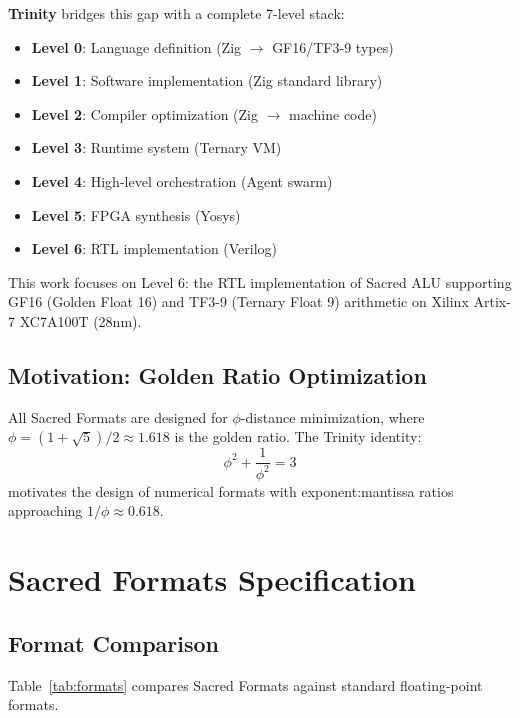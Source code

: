 \documentclass[10pt,conference]{IEEEtran}
\begin{document}
\textbf{Trinity} bridges this gap with a complete 7-level stack:
\begin{itemize}
  \item \textbf{Level 0}: Language definition (Zig $\to$ GF16/TF3-9 types)
  \item \textbf{Level 1}: Software implementation (Zig standard library)
  \item \textbf{Level 2}: Compiler optimization (Zig $\to$ machine code)
  \item \textbf{Level 3}: Runtime system (Ternary VM)
  \item \textbf{Level 4}: High-level orchestration (Agent swarm)
  \item \textbf{Level 5}: FPGA synthesis (Yosys)
  \item \textbf{Level 6}: RTL implementation (Verilog)
\end{itemize}

This work focuses on Level 6: the RTL implementation of Sacred ALU supporting GF16 (Golden Float 16) and TF3-9 (Ternary Float 9) arithmetic on Xilinx Artix-7 XC7A100T (28nm).

\subsection{Motivation: Golden Ratio Optimization}

All Sacred Formats are designed for $\phi$-distance minimization, where $\phi = (1 + \sqrt{5}) / 2 \approx 1.618$ is the golden ratio. The Trinity identity:
\begin{equation}
  \phi^2 + \frac{1}{\phi^2} = 3
\end{equation}
motivates the design of numerical formats with exponent:mantissa ratios approaching $1/\phi \approx 0.618$.


\section{Sacred Formats Specification}

\subsection{Format Comparison}

Table~\ref{tab:formats} compares Sacred Formats against standard floating-point formats.
\end{document}
